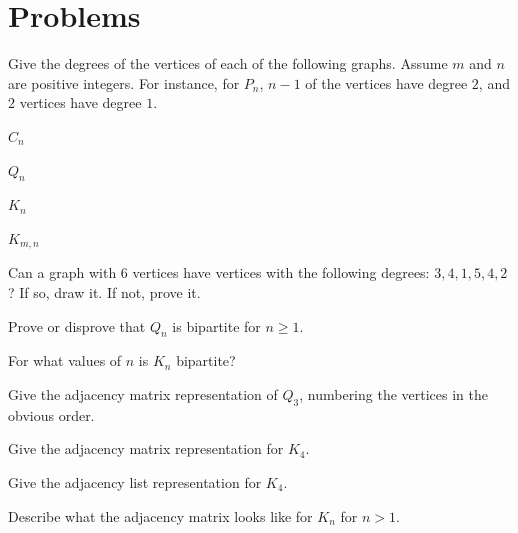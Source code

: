 
\newpage

\section{Problems}

\begin{pro}
Give the degrees of the vertices of each of the following graphs.
Assume $m$ and $n$ are positive integers.
For instance, for $P_n$, $n-1$ of the vertices have degree $2$, and
$2$ vertices have degree $1$.
\begin{lenum}
\item
$C_n$
\item
$Q_n$
\item
$K_n$
\item
$K_{m,n}$
\end{lenum}
\end{pro}

\begin{pro}
Can a graph with $6$ vertices have vertices with the following degrees:
$3, 4, 1, 5, 4, 2$?  If so, draw it.  If not, prove it.
\end{pro}

\begin{pro}
Prove or disprove that $Q_n$ is bipartite for $n\geq 1$.
\end{pro}

\begin{pro}
For what values of $n$ is $K_n$ bipartite?
\end{pro}

\begin{pro}
Give the adjacency matrix representation of $Q_3$, numbering the vertices in the obvious order.
\end{pro}

\begin{pro}
\begin{lenum}
\item
Give the adjacency matrix representation for $K_4$.
\item
Give the adjacency list representation for $K_4$.
\end{lenum}
\end{pro}

\begin{pro}
Describe what the adjacency matrix looks like for $K_n$ for $n>1$.
\end{pro}

